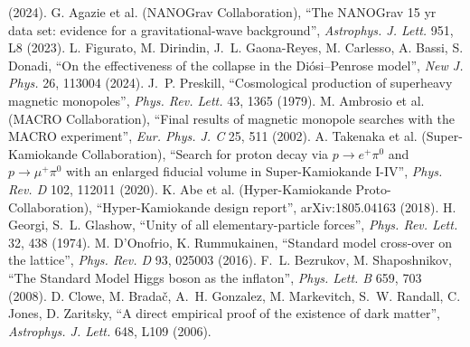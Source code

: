 (2024).
 G. Agazie et al. (NANOGrav Collaboration), ``The NANOGrav 15 yr data set: evidence for a gravitational-wave
background'', \emph{Astrophys. J. Lett.} 951, L8 (2023).
 L. Figurato, M. Dirindin, J.~L. Gaona-Reyes, M. Carlesso, A. Bassi, S. Donadi, ``On the effectiveness of the collapse
in the Di\'osi--Penrose model'', \emph{New J. Phys.} 26, 113004 (2024).
 J.~P. Preskill, ``Cosmological production of superheavy magnetic monopoles'', \emph{Phys. Rev. Lett.} 43, 1365 (1979).
 M. Ambrosio et al. (MACRO Collaboration), ``Final results of magnetic monopole searches with the MACRO experiment'',
\emph{Eur. Phys. J. C} 25, 511 (2002).
 A. Takenaka et al. (Super-Kamiokande Collaboration), ``Search for proton decay via $p\to e^+\pi^0$ and $p\to\mu^+\pi^0$
with an enlarged fiducial volume in Super-Kamiokande I-IV'', \emph{Phys. Rev. D} 102, 112011 (2020).
 K. Abe et al. (Hyper-Kamiokande Proto-Collaboration), ``Hyper-Kamiokande design report'', arXiv:1805.04163 (2018).
 H. Georgi, S.~L. Glashow, ``Unity of all elementary-particle forces'', \emph{Phys. Rev. Lett.} 32, 438 (1974).
 M. D'Onofrio, K. Rummukainen, ``Standard model cross-over on the lattice'', \emph{Phys. Rev. D} 93, 025003 (2016).
 F.~L. Bezrukov, M. Shaposhnikov, ``The Standard Model Higgs boson as the inflaton'', \emph{Phys. Lett. B} 659, 703
(2008).
 D. Clowe, M. Brada\v{c}, A.~H. Gonzalez, M. Markevitch, S.~W. Randall, C. Jones, D. Zaritsky, ``A direct empirical proof of
the existence of dark matter'', \emph{Astrophys. J. Lett.} 648, L109 (2006).
